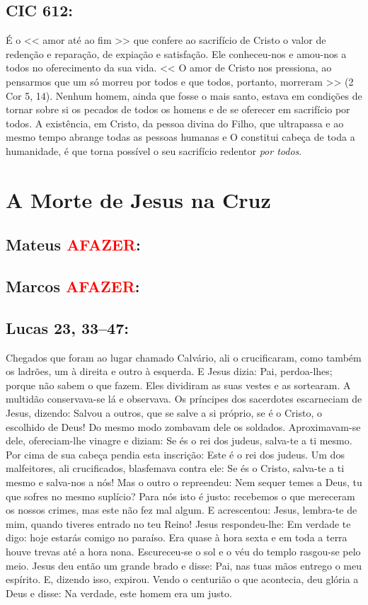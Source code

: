\documentclass[10pt,a5paper]{book}
\newcommand{\from}[1]{\subsection*{#1}}
\newcommand{\TODO}{\textcolor{red}{\ttfamily AFAZER}}
\begin{document}
\from{CIC 612:}

É o << amor até ao fim >> que confere ao sacrifício de Cristo o valor de redenção e reparação, de expiação e satisfação.
Ele conheceu-nos e amou-nos a todos no oferecimento da sua vida.
<< O amor de Cristo nos pressiona, ao pensarmos que um só morreu por todos e que todos, portanto, morreram >> (2 Cor 5, 14).
Nenhum homem, ainda que fosse o mais santo, estava em condições de tornar sobre si os pecados de todos os homens e de se oferecer em sacrifício por todos.
A existência, em Cristo, da pessoa divina do Filho, que ultrapassa e ao mesmo tempo abrange todas as pessoas humanas e O constitui cabeça de toda a humanidade, é que torna possível o seu sacrifício redentor \emph{por todos}.


\section{A Morte de Jesus na Cruz}

\from{Mateus \TODO:}

\from{Marcos \TODO:}

\from{Lucas 23, 33--47:}

Chegados que foram ao lugar chamado Calvário, ali o crucificaram, como também os ladrões, um à direita e outro à esquerda.
E Jesus dizia:
Pai, perdoa-lhes;
porque não sabem o que fazem.
Eles dividiram as suas vestes e as sortearam.
A multidão conservava-se lá e observava.
Os príncipes dos sacerdotes escarneciam de Jesus, dizendo:
Salvou a outros, que se salve a si próprio, se é o Cristo, o escolhido de Deus!
Do mesmo modo zombavam dele os soldados.
Aproximavam-se dele, ofereciam-lhe vinagre e diziam:
Se és o rei dos judeus, salva-te a ti mesmo.
Por cima de sua cabeça pendia esta inscrição:
Este é o rei dos judeus.
Um dos malfeitores, ali crucificados, blasfemava contra ele:
Se és o Cristo, salva-te a ti mesmo e salva-nos a nós!
Mas o outro o repreendeu:
Nem sequer temes a Deus, tu que sofres no mesmo suplício?
Para nós isto é justo:
recebemos o que mereceram os nossos crimes, mas este não fez mal algum.
E acrescentou:
Jesus, lembra-te de mim, quando tiveres entrado no teu Reino!
Jesus respondeu-lhe:
Em verdade te digo:
hoje estarás comigo no paraíso.
Era quase à hora sexta e em toda a terra houve trevas até a hora nona.
Escureceu-se o sol e o véu do templo rasgou-se pelo meio.
Jesus deu então um grande brado e disse:
Pai, nas tuas mãos entrego o meu espírito.
E, dizendo isso, expirou.
Vendo o centurião o que acontecia, deu glória a Deus e disse:
Na verdade, este homem era um justo.
\end{document}
